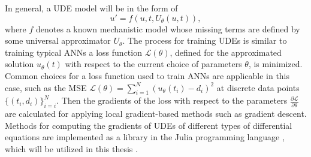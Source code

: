 In general, a \gls{UDE} model will be in the form of \cite{rackauckasUniversalDifferentialEquations2020}
\begin{equation*}
    u' = f(u, t, U_\theta(u, t)),
\end{equation*}
where $f$ denotes a known mechanistic model whose missing terms are defined by some universal approximator $U_\theta$.
The process for training \glspl{UDE} is similar to training typical \glspl{ANN} a loss function $\mathcal{L}(\theta)$, defined for the approximated solution $u_\theta(t)$ with respect to the current choice of parameters $\theta$, is minimized.
Common choices for a loss function used to train \glspl{ANN} are applicable in this case, such as the \gls{MSE} $\mathcal{L}(\theta) = \sum_{i=1}^{N} (u_\theta(t_i) - d_i)^2$ at discrete data points $\{(t_i, d_i)\}_{i=i}^N$.
Then the gradients of the loss with respect to the parameters $\frac{\partial\mathcal{L}}{\partial\theta}$ are calculated for applying local gradient-based methods such as gradient descent.
Methods for computing the gradients of \glspl{UDE} of different types of differential equations are implemented as a library in the Julia programming language \cite{bezanson2012julia}, which will be utilized in this thesis \cite{rackauckasUniversalDifferentialEquations2020}.